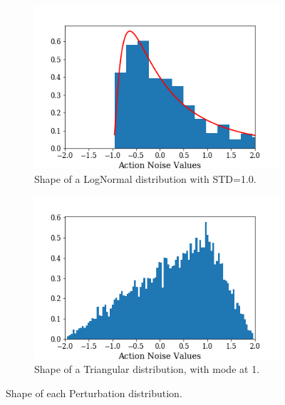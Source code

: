 \begin{figure}
\begin{subfigure}[b]{0.45\textwidth}
                \end{subfigure}
                \hfill
                \begin{subfigure}[b]{0.45\textwidth}
                    \centering
                    \includegraphics[width=\textwidth]{images/results/noises_logn_dist.png}
                    \caption{Shape of a LogNormal distribution with STD=1.0.}
                    \label{fig:noises_logn_dist}
                \end{subfigure}
                \hfill
                \begin{subfigure}[b]{0.45\textwidth}
                    \centering
                    \includegraphics[width=\textwidth]{images/results/noises_tri_dist.png}
                    \caption{Shape of a Triangular distribution, with mode at 1.}
                    \label{fig:noises_tri_dist}
                \end{subfigure}
                \caption{Shape of each Perturbation distribution. }
                \label{fig:noises_all}
            \end{figure}
            
